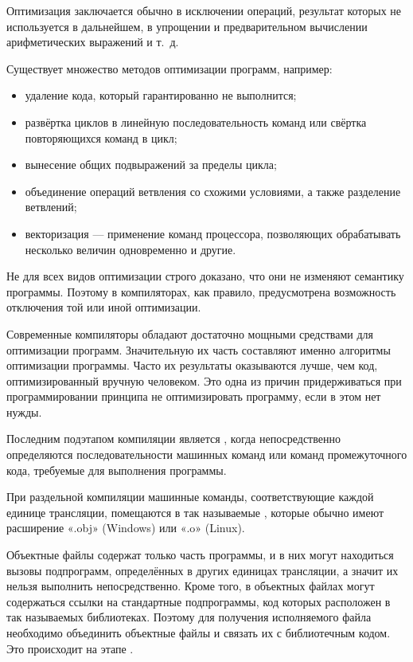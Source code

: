 Оптимизация заключается обычно в исключении операций, результат
которых не используется в дальнейшем, в упрощении и предварительном
вычислении арифметических выражений и т.~д.

Существует множество методов оптимизации программ, например:
\begin{itemize}
\item удаление кода, который гарантированно не выполнится;
\item развёртка циклов в линейную последовательность команд или
  свёртка повторяющихся команд в цикл;
\item вынесение общих подвыражений за пределы цикла;
\item объединение операций ветвления со схожими условиями, а также
  разделение ветвлений;
\item векторизация — применение команд процессора, позволяющих
  обрабатывать несколько величин одновременно и другие.
\end{itemize}

Не для всех видов оптимизации строго доказано, что они не изменяют
семантику программы. Поэтому в компиляторах, как правило,
предусмотрена возможность отключения той или иной оптимизации.

Современные компиляторы обладают достаточно мощными средствами для
оптимизации программ. Значительную их часть составляют именно
алгоритмы оптимизации программы. Часто их результаты оказываются
лучше, чем код, оптимизированный вручную человеком. Это одна из причин
придерживаться при программировании принципа не оптимизировать
программу, если в этом нет нужды.


Последним подэтапом компиляции является , когда непосредственно определяются
последовательности машинных команд или команд промежуточного кода,
требуемые для выполнения программы.


При раздельной компиляции машинные команды, соответствующие каждой
единице трансляции, помещаются в так называемые
, которые обычно имеют
расширение «.obj» (Windows) или «.o» (Linux).

Объектные файлы содержат только часть программы, и в них могут
находиться вызовы подпрограмм, определённых в других единицах
трансляции, а значит их нельзя выполнить непосредственно.  Кроме того,
в объектных файлах могут содержаться ссылки на стандартные
подпрограммы, код которых расположен в так называемых библиотеках.
Поэтому для получения исполняемого файла необходимо объединить
объектные файлы и связать их с библиотечным кодом. Это происходит на
этапе .

